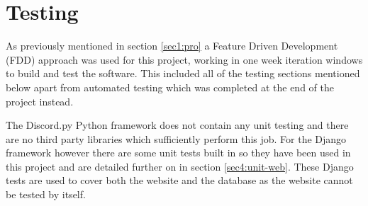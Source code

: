 \chapter{Testing}







As previously mentioned in section \ref{sec1:pro} a Feature Driven Development (FDD) approach was used for this project, working in one week iteration windows to build and test the software. This included all of the testing sections mentioned below apart from automated testing which was completed at the end of the project instead.

The Discord.py Python framework does not contain any unit testing and there are no third party libraries which sufficiently perform this job. For the Django framework however there are some unit tests built in so they have been used in this project and are detailed further on in section \ref{sec4:unit-web}. These Django tests are used to cover both the website and the database as the website cannot be tested by itself. 

